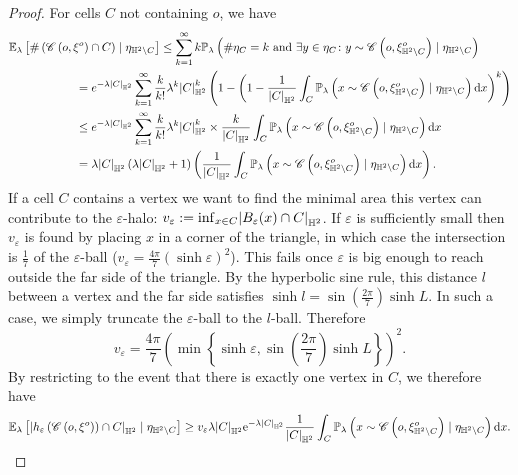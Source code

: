 \documentclass[10pt,a4paper,dvipsnames]{article}
\theoremstyle{definition}
\theoremstyle{remark}
\newcommand{\pla}{\mathbb P_\lambda}
\newcommand{\ela}{\mathbb E_{\lambda}}
\newcommand{\HypTwo}{{\mathbb{H}^2}}
\newcommand{\dd}{\mathrm{d}} %
\newcommand{\C}{\mathscr {C}}
\DeclarePairedDelimiter\abs{\lvert}{\rvert}
\newcommand{\habs}[1]{\abs*{#1}_\HypTwo}
\newcommand{\orig}{o}
\newcommand{\e}{\mathrm{e}}
\numberwithin{equation}{section}
\begin{document}
\begin{proof}
    For cells $C$ not containing $\orig$, we have
    \begin{align}
        &\ela\left[\#\left(\C\left(\orig,\xi^\orig\right)\cap C\right) \mid\eta_{\HypTwo\setminus C}\right] \leq \sum_{k=1}^\infty k\pla\left(\#\eta_C=k \text{ and }\exists y\in\eta_C\colon y\sim \C\left(\orig,\xi^\orig_{\HypTwo\setminus C}\right)\mid \eta_{\HypTwo\setminus C}\right) \nonumber\\
        &\hspace{2cm} = e^{-\lambda\habs{C}}\sum_{k=1}^\infty \frac{k}{k!}\lambda^k\habs{C}^k\left(1-\left(1-\frac{1}{\habs{C}}\int_C\pla\left(x\sim\C\left(\orig,\xi^\orig_{\HypTwo\setminus C}\right)\mid \eta_{\HypTwo\setminus C}\right)\dd x\right)^k\right)\nonumber\\
        &\hspace{2cm}\leq e^{-\lambda\habs{C}}\sum_{k=1}^\infty \frac{k}{k!}\lambda^k\habs{C}^k\times \frac{k}{\habs{C}}\int_C\pla\left(x\sim\C\left(\orig,\xi^\orig_{\HypTwo\setminus C}\right)\mid \eta_{\HypTwo\setminus C}\right)\dd x \nonumber\\
        &\hspace{2cm}= \lambda\habs{C}\left(\lambda\habs{C}+1\right)\left(\frac{1}{\habs{C}}\int_C\pla\left(x\sim\C\left(\orig,\xi^\orig_{\HypTwo\setminus C}\right)\mid \eta_{\HypTwo\setminus C}\right)\dd x \right).
    \end{align}
    If a cell $C$ contains a vertex we want to find the minimal area this vertex can contribute {to the $\varepsilon$-halo}: $v_\varepsilon:=\inf_{x\in C}\habs{B_\varepsilon(x)\cap C}$. If $\varepsilon$ is sufficiently small then $v_\varepsilon$ is found by placing $x$ in a corner of the triangle, in which case the intersection is $\frac{1}{7}$ of the $\varepsilon$-ball ($v_\varepsilon=\frac{4\pi}{7}\left(\sinh \varepsilon\right)^2$). This fails once $\varepsilon$ is big enough to reach outside the far side of the triangle. By the hyperbolic sine rule, this distance $l$ between a vertex and the far side satisfies $\sinh l = \sin\left(\frac{2\pi}{7}\right)\sinh L$. In such a case, we simply truncate the $\varepsilon$-ball to the $l$-ball. Therefore
    \begin{equation}
        v_\varepsilon=\frac{4\pi}{7}\left(\min\left\{\sinh \varepsilon, \sin\left(\frac{2\pi}{7}\right)\sinh L\right\}\right)^2.
    \end{equation}
    By restricting to the event that there is exactly one vertex in $C$, we therefore have
    \begin{equation}
        \ela\left[\habs{h_\varepsilon\left(\C\left(\orig,\xi^\orig\right)\right)\cap C} \mid\eta_{\HypTwo\setminus C}\right] \geq v_\varepsilon \lambda\habs{C}\e^{-\lambda\habs{C}}\frac{1}{\habs{C}}\int_C\pla\left(x\sim\C\left(\orig,\xi^\orig_{\HypTwo\setminus C}\right)\mid \eta_{\HypTwo\setminus C}\right)\dd x.

\end{equation}
\end{proof}
\end{document}
